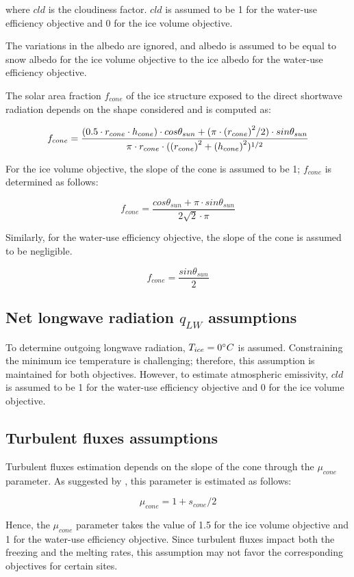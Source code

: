 where $cld$ is the cloudiness factor. $cld$ is assumed to be 1 for the water-use efficiency objective and 0 for the ice volume
objective.

The variations in the albedo are ignored, and albedo is assumed to be equal to snow albedo for the
ice volume objective to the ice albedo for the water-use efficiency objective.

The solar area fraction $f_{cone}$ of the ice structure exposed to the direct shortwave radiation depends on the
shape considered and is computed as:

\begin{equation}
		f_{cone} =\frac{(0.5 \cdot r_{cone} \cdot h_{cone}) \cdot cos \theta_{sun} +(\pi \cdot
			{(r_{cone})}^2/2) \cdot sin \theta_{sun} }{\pi \cdot r_{cone} \cdot ({(r_{cone})}^2+{(h_{cone})}^2)^{1/2}}\\
\end{equation}

For the ice volume objective, the slope of the cone is assumed to be 1; $f_{cone}$ is determined as follows:

\begin{equation}
		f_{cone} =\frac{ cos \theta_{sun} + \pi \cdot sin \theta_{sun} }{2\sqrt{2} \cdot \pi }
\end{equation}

Similarly, for the water-use efficiency objective, the slope of the cone is assumed to be negligible.

\begin{equation}
		f_{cone} =\frac{ sin \theta_{sun} }{2 }
\end{equation}

\subsection{Net longwave radiation \texorpdfstring{$q_{LW}$}{Lg} assumptions} 

To determine outgoing longwave radiation, $T_{ice} = 0 ^{\circ} C$ is assumed. Constraining the minimum ice
temperature is challenging; therefore, this assumption is maintained for both objectives. However, to
estimate atmospheric emissivity, $cld$ is assumed to be 1 for the water-use efficiency objective and 0 for the ice volume
objective.

\subsection{Turbulent fluxes assumptions} 

Turbulent fluxes estimation depends on the slope of the cone through the $\mu_{cone}$ parameter. As suggested 
by \citet{oerlemansBriefCommunicationGrowth2021}, this parameter is estimated as follows:

\begin{equation}
  \mu_{cone} =1 + s_{cone}/2
\end{equation}

Hence, the $\mu_{cone}$ parameter takes the value of 1.5 for the ice volume objective and 1 for the water-use efficiency
objective. Since turbulent fluxes impact both the freezing and the melting rates, this assumption
may not favor the corresponding objectives for certain sites.
